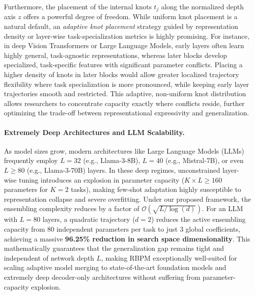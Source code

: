 Furthermore, the placement of the internal knots $t_j$ along the normalized depth axis $z$ offers a powerful degree of freedom. While uniform knot placement is a natural default, an \emph{adaptive knot placement} strategy guided by representation density or layer-wise task-specialization metrics is highly promising. For instance, in deep Vision Transformers or Large Language Models, early layers often learn highly general, task-agnostic representations, whereas later blocks develop specialized, task-specific features with significant parameter conflicts. Placing a higher density of knots in later blocks would allow greater localized trajectory flexibility where task specialization is more pronounced, while keeping early layer trajectories smooth and restricted. This adaptive, non-uniform knot distribution allows researchers to concentrate capacity exactly where conflicts reside, further optimizing the trade-off between representational expressivity and generalization.

\paragraph{Extremely Deep Architectures and LLM Scalability.}
As model sizes grow, modern architectures like Large Language Models (LLMs) frequently employ $L = 32$ (e.g., Llama-3-8B), $L = 40$ (e.g., Mistral-7B), or even $L \ge 80$ (e.g., Llama-3-70B) layers. In these deep regimes, unconstrained layer-wise tuning introduces an explosion in parameter capacity ($K \times L \ge 160$ parameters for $K=2$ tasks), making few-shot adaptation highly susceptible to representation collapse and severe overfitting. Under our proposed framework, the ensembling complexity reduces by a factor of $\mathcal{O}(\sqrt{L / \log(d)})$. For an LLM with $L = 80$ layers, a quadratic trajectory ($d = 2$) reduces the active ensembling capacity from $80$ independent parameters per task to just $3$ global coefficients, achieving a massive \textbf{96.25\% reduction in search space dimensionality}. This mathematically guarantees that the generalization gap remains tight and independent of network depth $L$, making RBPM exceptionally well-suited for scaling adaptive model merging to state-of-the-art foundation models and extremely deep decoder-only architectures without suffering from parameter-capacity explosion.

